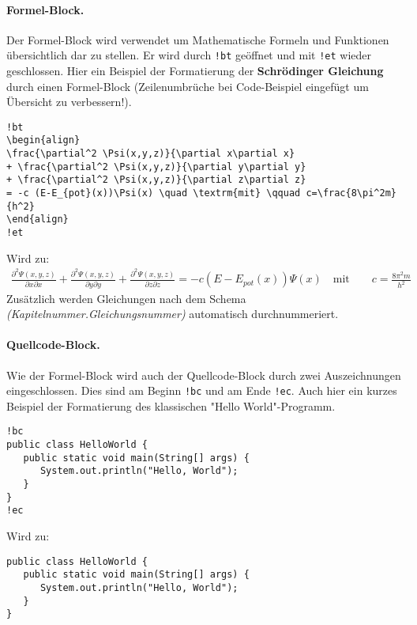\documentclass[%
oneside,                 %
final,                   %
chapterprefix=true,      %
open=right,              %
10pt]{book}
\begin{document}
\paragraph{Formel-Block.}
Der Formel-Block wird verwendet um Mathematische Formeln und Funktionen übersichtlich dar zu stellen. Er wird durch \Verb?!bt? geöffnet und mit \Verb?!et? wieder geschlossen. Hier ein Beispiel der Formatierung der \textbf{Schrödinger Gleichung} durch einen Formel-Block (Zeilenumbrüche bei Code-Beispiel eingefügt um Übersicht zu verbessern!).
\begin{verbatim}
!bt
\begin{align}
\frac{\partial^2 \Psi(x,y,z)}{\partial x\partial x}
+ \frac{\partial^2 \Psi(x,y,z)}{\partial y\partial y}
+ \frac{\partial^2 \Psi(x,y,z)}{\partial z\partial z}
= -c (E-E_{pot}(x))\Psi(x) \quad \textrm{mit} \qquad c=\frac{8\pi^2m}{h^2}
\end{align}
!et
\end{verbatim}
Wird zu:
\begin{align}
\frac{\partial^2 \Psi(x,y,z)}{\partial x\partial x} + \frac{\partial^2 \Psi(x,y,z)}{\partial y\partial y} + \frac{\partial^2 \Psi(x,y,z)}{\partial z\partial z} = -c (E-E_{pot}(x))\Psi(x) \quad \textrm{mit} \qquad c=\frac{8\pi^2m}{h^2}
\end{align}
Zusätzlich werden Gleichungen nach dem Schema \emph{(Kapitelnummer.Gleichungsnummer)} automatisch durchnummeriert.

\paragraph{Quellcode-Block.}
Wie der Formel-Block wird auch der Quellcode-Block durch zwei Auszeichnungen eingeschlossen. Dies sind am Beginn \Verb?!bc? und am Ende \Verb?!ec?. Auch hier ein kurzes Beispiel der Formatierung des klassischen "Hello World"-Programm.
\begin{verbatim}
!bc
public class HelloWorld {
   public static void main(String[] args) {
      System.out.println("Hello, World");
   }
}
!ec
\end{verbatim}
Wird zu:
\begin{verbatim}
public class HelloWorld {
   public static void main(String[] args) {
      System.out.println("Hello, World");
   }
}
\end{verbatim}
\end{document}
